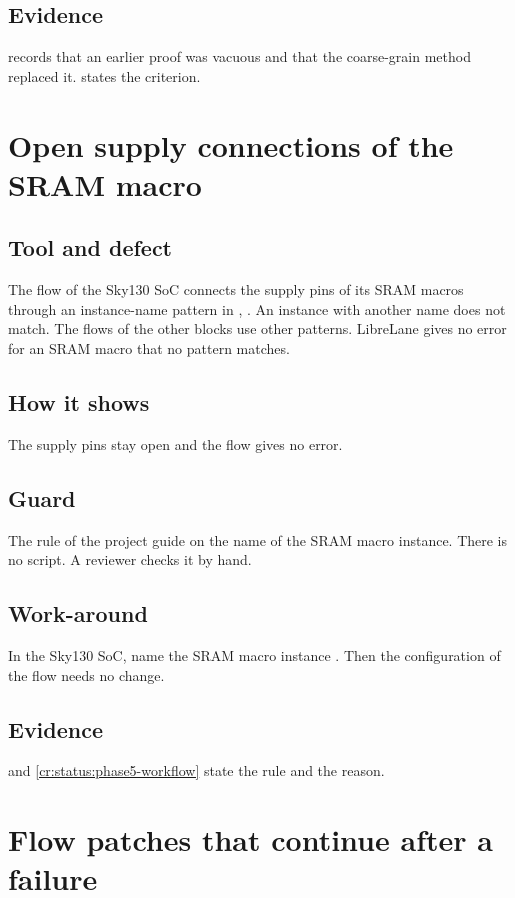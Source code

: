 \subsection*{Evidence}
 records that an earlier proof was vacuous and that the coarse-grain method replaced it.  states the criterion.

\section{Open supply connections of the SRAM macro}\label{tm:defect:sram-macro-instance-name}
\subsection*{Tool and defect}
The flow of the Sky130 SoC connects the supply pins of its SRAM macros through an instance-name pattern in , . An instance with another name does not match. The flows of the other blocks use other patterns. LibreLane gives no error for an SRAM macro that no pattern matches.

\subsection*{How it shows}
The supply pins stay open and the flow gives no error.

\subsection*{Guard}
The rule of the project guide on the name of the SRAM macro instance. There is no script. A reviewer checks it by hand.

\subsection*{Work-around}
In the Sky130 SoC, name the SRAM macro instance . Then the configuration of the flow needs no change.

\subsection*{Evidence}
 and \cref{cr:status:phase5-workflow} state the rule and the reason.

\section{Flow patches that continue after a failure}\label{tm:defect:flow-swallows-failure}
